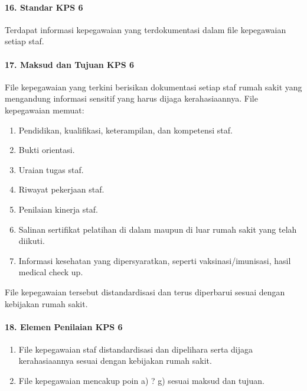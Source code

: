 \documentclass[
]{book}
\providecommand{\tightlist}{%
  \setlength{\itemsep}{0pt}\setlength{\parskip}{0pt}}
\begin{document}
\hypertarget{standar-kps-6}{%
\paragraph*{16. Standar KPS 6}\label{standar-kps-6}}

Terdapat informasi kepegawaian yang terdokumentasi dalam file kepegawaian setiap staf.

\hypertarget{maksud-dan-tujuan-kps-6}{%
\paragraph*{17. Maksud dan Tujuan KPS 6}\label{maksud-dan-tujuan-kps-6}}

File kepegawaian yang terkini berisikan dokumentasi setiap staf rumah sakit yang mengandung informasi sensitif yang harus dijaga kerahasiaannya. File kepegawaian memuat:

\begin{enumerate}
\def\labelenumi{\alph{enumi}.}
\tightlist
\item
  Pendidikan, kualifikasi, keterampilan, dan kompetensi staf.
\item
  Bukti orientasi.
\item
  Uraian tugas staf.
\item
  Riwayat pekerjaan staf.
\item
  Penilaian kinerja staf.
\item
  Salinan sertifikat pelatihan di dalam maupun di luar rumah sakit yang telah diikuti.
\item
  Informasi kesehatan yang dipersyaratkan, seperti vaksinasi/imunisasi, hasil medical check up.
\end{enumerate}

File kepegawaian tersebut distandardisasi dan terus diperbarui sesuai dengan kebijakan rumah sakit.

\hypertarget{elemen-penilaian-kps-6}{%
\paragraph*{18. Elemen Penilaian KPS 6}\label{elemen-penilaian-kps-6}}

\begin{enumerate}
\def\labelenumi{\alph{enumi}.}
\tightlist
\item
  File kepegawaian staf distandardisasi dan dipelihara serta dijaga kerahasiaannya sesuai dengan kebijakan rumah sakit.
\item
  File kepegawaian mencakup poin a) ? g) sesuai maksud dan tujuan.
\end{enumerate}
\end{document}
